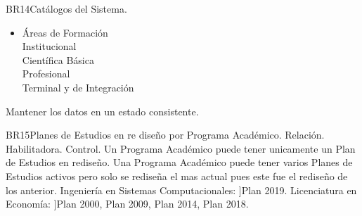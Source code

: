 \begin{BussinesRule}{BR14}{Catálogos del Sistema.}
\begin{itemize}
            Escuela Superior de Cómputo (ESCOM) \\
            Unidad Profesional Interdisciplinaria de Ingeniería y Ciencias Sociales y Administrativas ( UPIICSA) \\
            Unidad Profesional Interdisciplinaria en Ingeniería y Tecnologías Avanzadas (UPIITA) \\
            Unidad Profesional Interdisciplinaria de Biotecnología (UPIBI) \\
            Unidad Profesional Interdisciplinaria de Ingeniería, Campus Guanajuato (UPIIG) \\
            Unidad Profesional Interdisciplinaria de Ingeniería, Campus Zacatecas (UPIIZ) \\
            Escuela Nacional de Ciencias Biológicas (ENCB) \\
            Escuela Superior de Medicina (ESM) \\
            Escuela Nacional de Medicina y Homeopatía (ENMH) \\
            Escuela Superior de Enfermería y Obstetricia (ESEO) \\
            Centro Interdisciplinario de Ciencias de la Salud (CICS) Unidad Milpa Alta \\
            Centro Interdisciplinario de Ciencias de la Salud (CICS) Unidad Santo Tomás \\
            Escuela Superior de Comercio y Administración (ESCA) Unidad Santo Tomás \\
            Escuela Superior de Comercio y Administración (ESCA) Unidad Tepepan \\
            Escuela Superior de Economía (ESE) \\
            Escuela Superior de Turismo (EST) \\
            Centro de Lenguas Extranjeras
        \item Áreas de Formación\\
            Institucional\\
            Científica Básica\\
            Profesional\\
            Terminal y de Integración
    \end{itemize}
    \BRitem[Motivación: ]Mantener los datos en un estado consistente.
\end{BussinesRule}
\begin{BussinesRule}{BR15}{Planes de Estudios en re diseño por Programa Académico.}
    \BRitem[Tipo:] Relación.
    \BRitem[Clase:] Habilitadora.
    \BRitem[Nivel:] Control.
    \BRitem[Descripción:] Un Programa Académico puede tener unicamente un Plan de Estudios en rediseño.
    \BRitem[Motivación: ]Una Programa Académico puede tener varios Planes de Estudios activos pero solo se rediseña el mas actual pues este fue el rediseño de los anterior.
     Ingeniería en Sistemas Computacionales: ]Plan 2019.
     Licenciatura en Economía: ]Plan 2000, Plan 2009, Plan 2014, Plan 2018.
\end{BussinesRule}
